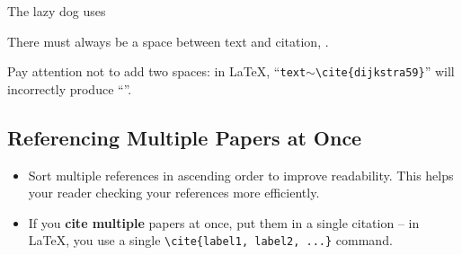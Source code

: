 \documentclass[11pt,a4paper]{article}
\begin{document}
\vspace{-1.5em}
\begin{badexample}
  \begin{NoHyper}
    The lazy dog uses 
    \vspace{0.25cm}
    
    There must always be a space between text and citation, .
    \vspace{0.25cm}
    
    Pay attention not to add two spaces: in \LaTeX, ``\texttt{text{\textvisiblespace}$\sim${\textbackslash}cite\{dijkstra59\}}'' will incorrectly produce ``''.
  \end{NoHyper}
\end{badexample}


\subsection{Referencing Multiple Papers at Once}

\begin{itemize}
  \item Sort multiple references in ascending order to improve readability. This helps your reader checking your references more efficiently.
  \item If you \textbf{cite multiple} papers at once, put them in a single citation -- in \LaTeX, you use a single \texttt{\textbackslash{cite}\{label1, label2, ...\}} command.
\end{itemize}

\begin{goodexample}
  \begin{NoHyper}
    
  
  \end{NoHyper}
\end{goodexample}
\vspace{-1.5em}
\begin{badexample}
  \begin{NoHyper}
    
  \end{NoHyper}
\end{badexample}
\end{document}
